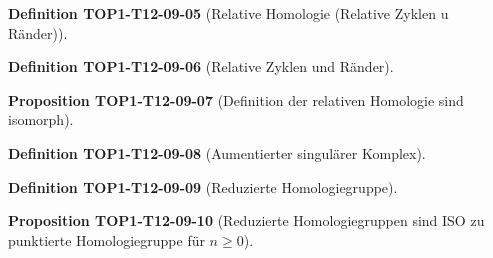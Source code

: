 \documentclass[10pt, letterpaper]{article}
\newcommand{\CustomHeading}[3]{%
  \par\medskip\noindent%
  \textbf{#1 #2} \textnormal{(#3)}.\enskip%
}
\newenvironment{DEF}[2]{\CustomHeading{Definition}{#1}{#2}}{}
\newenvironment{PROP}[2]{\CustomHeading{Proposition}{#1}{#2}}{}
\begin{document}
\begin{DEF}{TOP1-T12-09-05}{Relative Homologie (Relative Zyklen u Ränder)}
\end{DEF}

\begin{DEF}{TOP1-T12-09-06}{Relative Zyklen und Ränder}
\end{DEF}

\begin{PROP}{TOP1-T12-09-07}{Definition der relativen Homologie sind isomorph}
\end{PROP}

\begin{DEF}{TOP1-T12-09-08}{Aumentierter singulärer Komplex}
\end{DEF}

\begin{DEF}{TOP1-T12-09-09}{Reduzierte Homologiegruppe}
\end{DEF}

\begin{PROP}{TOP1-T12-09-10}{Reduzierte Homologiegruppen sind ISO zu punktierte Homologiegruppe für $n\geq 0$}
\end{PROP}

\pagebreak
\printbibliography
\end{document}
